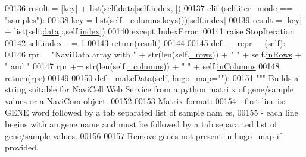 \begin{DoxyCode}
00136                 result = [key] + list(self.\hyperlink{classnavicom_1_1navidata_1_1NaviData_a25ff2e12663e590c22e82bb9a7863987}{data}[self.\hyperlink{classnavicom_1_1navidata_1_1NaviData_adb2e7ce6c9a691a186d91d4a8d49864a}{index},:])
00137             \textcolor{keywordflow}{elif} (self.\hyperlink{classnavicom_1_1navidata_1_1NaviData_ac21c979a9421ac607778d907380475fc}{iter_mode} == \textcolor{stringliteral}{"samples"}):
00138                 key = list(self.\hyperlink{classnavicom_1_1navidata_1_1NaviData_a1f3211f361097ad745c4a6c8f74887cf}{_columns}.keys())[self.\hyperlink{classnavicom_1_1navidata_1_1NaviData_adb2e7ce6c9a691a186d91d4a8d49864a}{index}]
00139                 result = [key] + list(self.\hyperlink{classnavicom_1_1navidata_1_1NaviData_a25ff2e12663e590c22e82bb9a7863987}{data}[:,self.\hyperlink{classnavicom_1_1navidata_1_1NaviData_adb2e7ce6c9a691a186d91d4a8d49864a}{index}])
00140         \textcolor{keywordflow}{except} IndexError:
00141             \textcolor{keywordflow}{raise} StopIteration
00142         self.\hyperlink{classnavicom_1_1navidata_1_1NaviData_adb2e7ce6c9a691a186d91d4a8d49864a}{index} += 1
00143         \textcolor{keywordflow}{return}(result)
00144 
00145     \textcolor{keyword}{def }\_\_repr\_\_(self):
00146         rpr = \textcolor{stringliteral}{"NaviData array with "} + str(len(self.\hyperlink{classnavicom_1_1navidata_1_1NaviData_a441bab93a769704074bba0c383b16986}{_rows})) + \textcolor{stringliteral}{" "} + self.\hyperlink{classnavicom_1_1navidata_1_1NaviData_a172b33d53b897135381a92b045f5576b}{inRows} +
       \textcolor{stringliteral}{" and "}
00147         rpr += str(len(self.\hyperlink{classnavicom_1_1navidata_1_1NaviData_a1f3211f361097ad745c4a6c8f74887cf}{_columns})) + \textcolor{stringliteral}{" "} + self.\hyperlink{classnavicom_1_1navidata_1_1NaviData_a080320f0715d257f61490985484e6d54}{inColumns}
00148         \textcolor{keywordflow}{return}(rpr)
00149 
00150     \textcolor{keyword}{def }\_makeData(self, hugo\_map=""):
00151         \textcolor{stringliteral}{""" Builds a string suitable for NaviCell Web Service from a python matri
      x of gene/sample values or a NaviCom object.}
00152 \textcolor{stringliteral}{}
00153 \textcolor{stringliteral}{        Matrix format:}
00154 \textcolor{stringliteral}{        - first line is: GENE word followed by a tab separated list of sample nam
      es,}
00155 \textcolor{stringliteral}{        - each line begins with an gene name and must be followed by a tab separa
      ted list of gene/sample values.}
00156 \textcolor{stringliteral}{}
00157 \textcolor{stringliteral}{        Remove genes not present in hugo\_map if provided.}

\end{DoxyCode}
